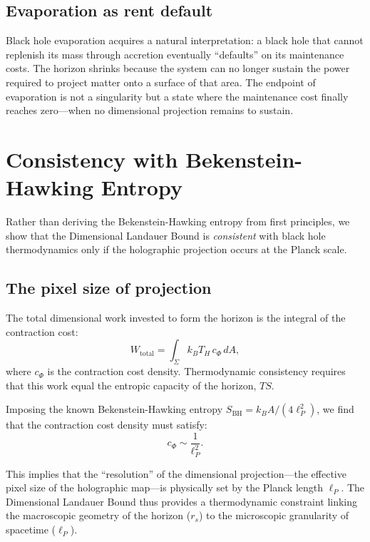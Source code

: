 \documentclass[aps,prd,twocolumn,superscriptaddress,floatfix]{revtex4-2}
\begin{document}
\subsection{Evaporation as rent default}

Black hole evaporation acquires a natural interpretation: a black hole that cannot replenish its mass through accretion eventually ``defaults'' on its maintenance costs. The horizon shrinks because the system can no longer sustain the power required to project matter onto a surface of that area. The endpoint of evaporation is not a singularity but a state where the maintenance cost finally reaches zero---when no dimensional projection remains to sustain.

\section{Consistency with Bekenstein-Hawking Entropy}

Rather than deriving the Bekenstein-Hawking entropy from first principles, we show that the Dimensional Landauer Bound is \emph{consistent} with black hole thermodynamics only if the holographic projection occurs at the Planck scale.

\subsection{The pixel size of projection}

The total dimensional work invested to form the horizon is the integral of the contraction cost:
\begin{equation}
W_{\mathrm{total}} = \int_\Sigma k_B T_H \, c_\Phi \, dA,
\end{equation}
where $c_\Phi$ is the contraction cost density. Thermodynamic consistency requires that this work equal the entropic capacity of the horizon, $TS$.

Imposing the known Bekenstein-Hawking entropy $S_{\mathrm{BH}} = k_B A / (4\ell_P^2)$, we find that the contraction cost density must satisfy:
\begin{equation}
c_\Phi \sim \frac{1}{\ell_P^2}.
\end{equation}

This implies that the ``resolution'' of the dimensional projection---the effective pixel size of the holographic map---is physically set by the Planck length $\ell_P$. The Dimensional Landauer Bound thus provides a thermodynamic constraint linking the macroscopic geometry of the horizon ($r_s$) to the microscopic granularity of spacetime ($\ell_P$).
\end{document}
